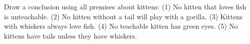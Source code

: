 Draw a conclusion using all premises about kittens: (1) No kitten that loves fish is unteachable. (2) No kitten without a tail will play with a gorilla. (3) Kittens with whiskers always love fish. (4) No teachable kitten has green eyes. (5) No kittens have tails unless they have whiskers.

